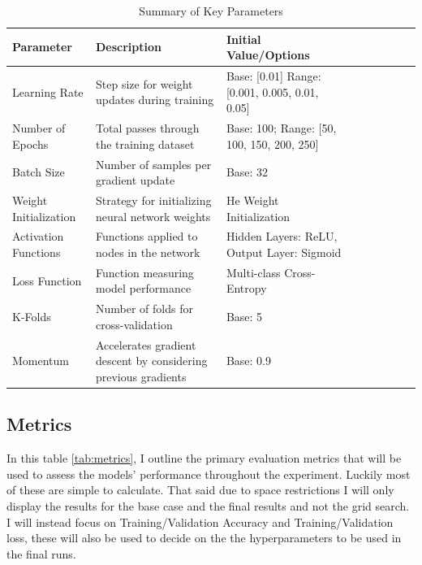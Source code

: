 \documentclass[conference]{IEEEtran}
\begin{document}
\begin{table}[h]
    \centering
    \caption{Summary of Key Parameters}
    \label{tab:parameters_summary}
    \begin{tabularx}{\textwidth}{@{}lXXXXXXXX@{}}
        \toprule
        \textbf{Parameter} & \textbf{Description}                                           & \textbf{Initial Value/Options}       \\ 
        \midrule
        Learning Rate                  & Step size for weight updates during training                  & Base: [0.01] Range: [0.001, 0.005, 0.01, 0.05] \\ 
        Number of Epochs               & Total passes through the training dataset                      & Base: 100; Range: [50, 100, 150, 200, 250]    \\ 
        Batch Size                     & Number of samples per gradient update                          & Base: 32     \\ 
        Weight Initialization          & Strategy for initializing neural network weights               & He Weight Initialization          \\ 
        Activation Functions           & Functions applied to nodes in the network                      & Hidden Layers: ReLU, Output Layer: Sigmoid \\ 
        Loss Function                  & Function measuring model performance                           & Multi-class Cross-Entropy           \\ 
        K-Folds                       & Number of folds for cross-validation                           & Base: 5         \\ 
        Momentum                      & Accelerates gradient descent by considering previous gradients   & Base: 0.9   \\ 
        \bottomrule
    \end{tabularx}
\end{table}

\subsection{Metrics}

In this table \ref{tab:metrics}, I outline the primary evaluation metrics that will be used to assess the models' performance throughout the experiment. Luckily most of these are simple to calculate. That said due to space restrictions I will only display the results for the base case and the final results and not the grid search. I will instead focus on Training/Validation Accuracy and Training/Validation loss, these will also be used to decide on the the hyperparameters to be used in the final runs.
\end{document}
